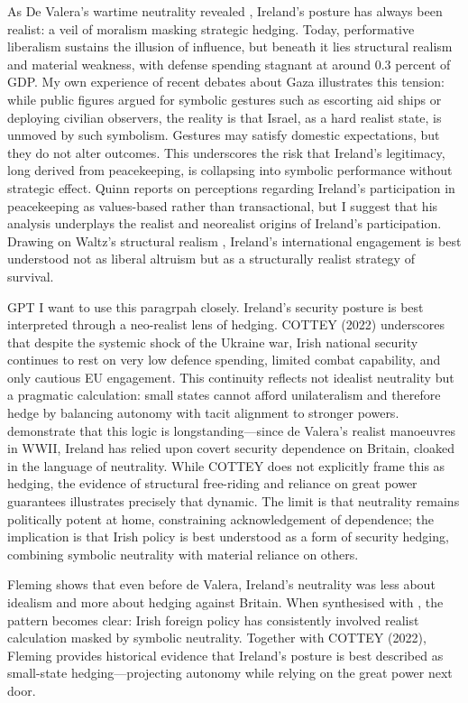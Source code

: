 As De Valera’s wartime neutrality revealed \parencite{FANNING_2015,AYIOTIS_2023}, Ireland’s posture has always been realist: a veil of moralism masking strategic hedging. Today, performative liberalism sustains the illusion of influence, but beneath it lies structural realism and material weakness, with defense spending stagnant at around 0.3 percent of GDP. My own experience of recent debates about Gaza illustrates this tension: while public figures argued for symbolic gestures such as escorting aid ships or deploying civilian observers, the reality is that Israel, as a hard realist state, is unmoved by such symbolism. Gestures may satisfy domestic expectations, but they do not alter outcomes. This underscores the risk that Ireland’s legitimacy, long derived from peacekeeping, is collapsing into symbolic performance without strategic effect. Quinn reports on perceptions regarding Ireland’s participation in peacekeeping as values-based rather than transactional, but I suggest that his analysis underplays the realist and neorealist origins of Ireland’s participation. Drawing on Waltz’s structural realism \parencite{WALTZ_1979}, Ireland’s international engagement is best understood not as liberal altruism but as a structurally realist strategy of survival.

GPT I want to use this paragrpah closely. \nocite{COTTEY_2022}Ireland’s security posture is best interpreted through a neo-realist lens of hedging. COTTEY (2022) underscores that despite the systemic shock of the Ukraine war, Irish national security continues to rest on very low defence spending, limited combat capability, and only cautious EU engagement. This continuity reflects not idealist neutrality but a pragmatic calculation: small states cannot afford unilateralism and therefore hedge by balancing autonomy with tacit alignment to stronger powers. \parencite{FANNING_2015,AYIOTIS_2023} demonstrate that this logic is longstanding—since de Valera’s realist manoeuvres in WWII, Ireland has relied upon covert security dependence on Britain, cloaked in the language of neutrality. While COTTEY does not explicitly frame this as hedging, the evidence of structural free-riding and reliance on great power guarantees illustrates precisely that dynamic. The limit is that neutrality remains politically potent at home, constraining acknowledgement of dependence; the implication is that Irish policy is best understood as a form of security hedging, combining symbolic neutrality with material reliance on others.

\nocite{FLEMING_2015} Fleming shows that even before de Valera, Ireland’s neutrality was less about idealism and more about hedging against Britain. When synthesised with \parencite{FANNING_2015,AYIOTIS_2023}, the pattern becomes clear: Irish foreign policy has consistently involved realist calculation masked by symbolic neutrality. Together with COTTEY (2022), Fleming provides historical evidence that Ireland’s posture is best described as small-state hedging—projecting autonomy while relying on the great power next door.

